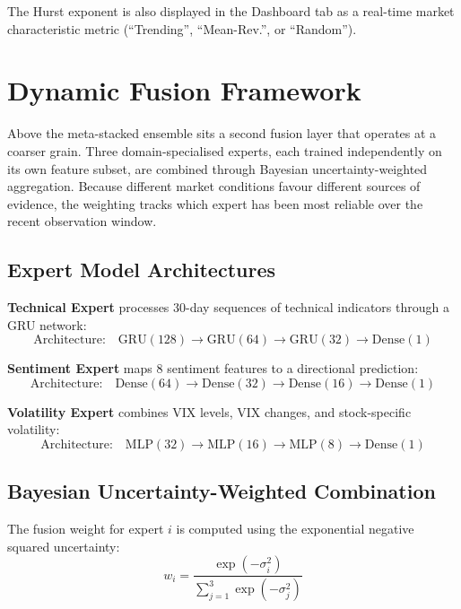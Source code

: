\documentclass[10pt,a4paper,twoside]{article}
\begin{document}
The Hurst exponent is also displayed in the Dashboard tab as a real-time
market characteristic metric (``Trending'', ``Mean-Rev.'', or ``Random'').

\section{Dynamic Fusion Framework}
\label{sec:fusion}

Above the meta-stacked ensemble sits a second fusion layer that operates at a
coarser grain. Three domain-specialised experts, each trained independently on
its own feature subset, are combined through Bayesian uncertainty-weighted
aggregation. Because different market conditions favour different sources of
evidence, the weighting tracks which expert has been most reliable over the
recent observation window.

\subsection{Expert Model Architectures}

\textbf{Technical Expert} processes 30-day sequences of technical indicators
through a GRU network:
\begin{equation}
  \text{Architecture:}\quad \text{GRU}(128) \to \text{GRU}(64) \to \text{GRU}(32) \to \text{Dense}(1)
\end{equation}

\textbf{Sentiment Expert} maps 8 sentiment features to a directional prediction:
\begin{equation}
  \text{Architecture:}\quad \text{Dense}(64) \to \text{Dense}(32) \to \text{Dense}(16) \to \text{Dense}(1)
\end{equation}

\textbf{Volatility Expert} combines VIX levels, VIX changes, and stock-specific
volatility:
\begin{equation}
  \text{Architecture:}\quad \text{MLP}(32) \to \text{MLP}(16) \to \text{MLP}(8) \to \text{Dense}(1)
\end{equation}

\subsection{Bayesian Uncertainty-Weighted Combination}

The fusion weight for expert $i$ is computed using the exponential negative
squared uncertainty:
\begin{equation}
  w_i = \frac{\exp(-\sigma_i^2)}{\sum_{j=1}^{3} \exp(-\sigma_j^2)}
  \label{eq:bayesian}
\end{equation}
\end{document}
